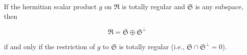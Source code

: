 If the hermitian scalar product $g$ on $\mathfrak{R}$ is totally regular and $\mathfrak{S}$ is any subspace, then

$$\mathfrak{R} = \mathfrak{S} \oplus \mathfrak{S}^\perp$$

if and only if the restriction of $g$ to $\mathfrak{S}$ is totally regular (i.e., $\mathfrak{S} \cap \mathfrak{S}^\perp = 0$).
